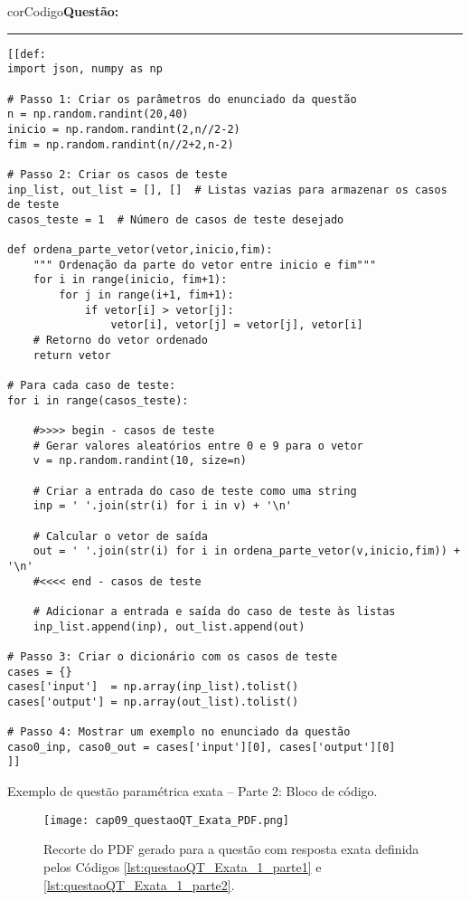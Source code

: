 \begin{listing}[!h]
\begin{myboxCode}{corCodigo}{\textbf{Questão: }}\vspace{3mm}
\hrule
\begin{verbatim}
[[def: 
import json, numpy as np

# Passo 1: Criar os parâmetros do enunciado da questão
n = np.random.randint(20,40)
inicio = np.random.randint(2,n//2-2)
fim = np.random.randint(n//2+2,n-2)
    
# Passo 2: Criar os casos de teste
inp_list, out_list = [], []  # Listas vazias para armazenar os casos de teste
casos_teste = 1  # Número de casos de teste desejado

def ordena_parte_vetor(vetor,inicio,fim):        
    """ Ordenação da parte do vetor entre inicio e fim"""
    for i in range(inicio, fim+1):
        for j in range(i+1, fim+1):
            if vetor[i] > vetor[j]:
                vetor[i], vetor[j] = vetor[j], vetor[i]
    # Retorno do vetor ordenado
    return vetor
    
# Para cada caso de teste:
for i in range(casos_teste):    

    #>>>> begin - casos de teste
    # Gerar valores aleatórios entre 0 e 9 para o vetor 
    v = np.random.randint(10, size=n) 

    # Criar a entrada do caso de teste como uma string
    inp = ' '.join(str(i) for i in v) + '\n'

    # Calcular o vetor de saída
    out = ' '.join(str(i) for i in ordena_parte_vetor(v,inicio,fim)) + '\n'
    #<<<< end - casos de teste

    # Adicionar a entrada e saída do caso de teste às listas
    inp_list.append(inp), out_list.append(out)

# Passo 3: Criar o dicionário com os casos de teste
cases = {}
cases['input']  = np.array(inp_list).tolist()
cases['output'] = np.array(out_list).tolist()

# Passo 4: Mostrar um exemplo no enunciado da questão
caso0_inp, caso0_out = cases['input'][0], cases['output'][0]
]]
\end{verbatim}
\end{myboxCode}
\caption{Exemplo de questão paramétrica exata -- Parte 2: Bloco de código.}
\label{lst:questaoQT_Exata_1_parte2}
\end{listing}


\begin{figure}[!ht]
  \texttt{[image: cap09\_questaoQT\_Exata\_PDF.png]}
  \caption{Recorte do PDF gerado para a questão com resposta exata definida pelos Códigos \ref{lst:questaoQT_Exata_1_parte1} e \ref{lst:questaoQT_Exata_1_parte2}.}
  \label{fig:cap09_questaoQT_Exata_PDF}
\end{figure}


